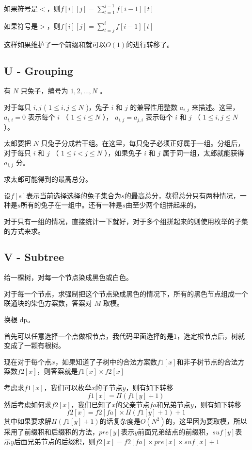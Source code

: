 如果符号是$<$，则$f[i][j] = \sum_{t = 1} ^{j-1} f[i-1][t]$

如果符号是$>$，则$f[i][j] = \sum_{t=j}^{i} f[i-1][t]$

这样如果维护了一个前缀和就可以$O(1)$的进行转移了。


\subsection{U - Grouping}
\begin{framed}
    有 $N$ 只兔子，编号为 $1, 2, \ldots, N$ 。

    对于每只 $i, j$ ( $1 \leq i, j \leq N$ )，兔子 $i$ 和 $j$ 的兼容性用整数 $a_{i, j}$ 来描述。这里， $a_{i, i} = 0$ 表示每个 $i$ （ $1 \leq i \leq N$ ）， $a_{i, j} = a_{j, i}$ 表示每个 $i$ 和 $j$ （ $1 \leq i, j \leq N$ ）。

    太郎要把 $N$ 只兔子分成若干组。在这里，每只兔子必须正好属于一组。分组后，对于每只 $i$ 和 $j$ （ $1 \leq i \lt j \leq N$ ），如果兔子 $i$ 和 $j$ 属于同一组，太郎就能获得 $a_{i, j}$ 分。

    求太郎可能得到的最高总分。
\end{framed}
设$f[s]$表示当前选择选择的兔子集合为$s$的最高总分，获得总分只有两种情况，一种是$s$所有的兔子在一组中。还有一种是$s$由至少两个组拼起来的。

对于只有一组的情况，直接统计一下就好，对于多个组拼起来的则使用枚举的子集的方式来求。


\subsection{V - Subtree}
\begin{framed}
    给一棵树，对每一个节点染成黑色或白色。

    对于每一个节点，求强制把这个节点染成黑色的情况下，所有的黑色节点组成一个联通块的染色方案数，答案对 $M$ 取模。
\end{framed}
换根 dp。

首先可以任意选择一个点做根节点，我代码里面选择的是$1$，选定根节点后，树就变成了一颗有根树。

现在对于每个点$x$，如果知道了子树中的合法方案数$f1[x]$和非子树节点的合法方案数$f2[x]$，则答案就是$f1[x] \times f2[x]$

考虑求$f1[x]$，我们可以枚举$x$的子节点$y$，则有如下转移
\[
    f1[x] = \Pi (f1[y] + 1)
\]
然后考虑如何求$f2[x]$，我们已知了$x$的父亲节点$fa$和兄弟节点$y$，则有如下转移
\[
    f2[x] = f2[fa] \times\Pi (f1[y] + 1) + 1
\]
其中如果要求解$\Pi(f1[y]+1)$的话复杂度是$O(N^2)$的，这里因为要取模，所以采用了前缀积和后缀积的方法，$pre[y]$表示$y$前面兄弟结点的前缀积，$suf[y]$表示$y$后面兄弟节点的后缀积，则$f2[x] = f2[fa]\times pre[x]\times suf[x] + 1$


